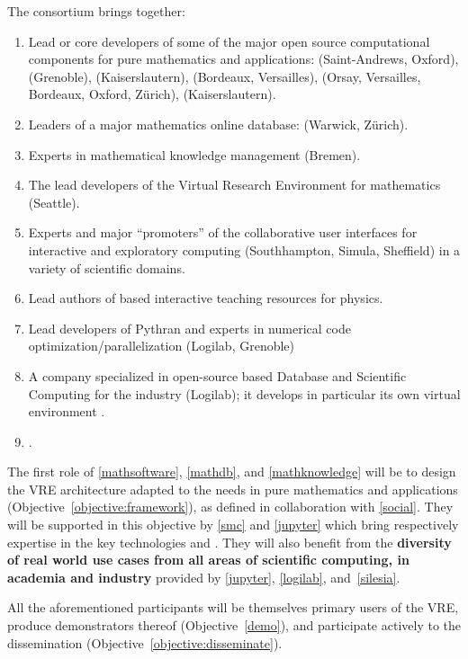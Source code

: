 \documentclass[noworkareas,deliverables,keys]{euproposal}                  %
\begin{document}
\begin{proposal}
The consortium brings together:
\begin{enumerate}
\item \label{mathsoftware} Lead or core developers of some of the
  major open source computational components for pure mathematics and
  applications: \GAP (Saint-Andrews, Oxford), \Linbox (Grenoble),
  \MPIR (Kaiserslautern), \Pari (Bordeaux, Versailles), \Sage (Orsay,
  Versailles, Bordeaux, Oxford, Zürich), \Singular (Kaiserslautern).
\item \label{mathdb} Leaders of a major mathematics online database:
  \LMFDB (Warwick, Zürich).
\item \label{mathknowledge} Experts in mathematical knowledge
  management (Bremen).
\item \label{smc} The lead developers of the Virtual Research
  Environment for mathematics \SMC (Seattle).
\item \label{jupyter} Experts and major ``promoters'' of the \Jupyter
  collaborative user interfaces for interactive and exploratory
  computing (Southhampton, Simula, Sheffield) in a variety of
  scientific domains.
\item \label{silesia} Lead authors of \Jupyter based interactive
  teaching resources for physics.
\item \label{pythran} Lead developers of Pythran and experts in
  numerical code optimization/parallelization (Logilab, Grenoble)
\item \label{logilab} A company specialized in open-source based
  Database and Scientific Computing for the industry (Logilab); it
  develops in particular its own virtual environment \Simulagora.
\item \label{social} .
\end{enumerate}

The first role of \ref{mathsoftware}, \ref{mathdb}, and
\ref{mathknowledge} will be to design the \TheProject VRE architecture
adapted to the needs in pure mathematics and applications
(Objective~\ref{objective:framework}), as defined in collaboration
with \ref{social}. They will be supported in this objective by
\ref{smc} and \ref{jupyter} which bring respectively expertise in the
key technologies \SMC and \Jupyter. They will also benefit from the
\textbf{diversity of real world use cases from all areas of scientific
  computing, in academia and industry} provided by \ref{jupyter},
\ref{logilab}, and~\ref{silesia}.

All the aforementioned participants will be themselves primary users
of the \TheProject VRE, produce demonstrators thereof
(Objective~\ref{demo}), and participate actively to the dissemination
(Objective~\ref{objective:disseminate}).


\end{proposal}
\end{document}

